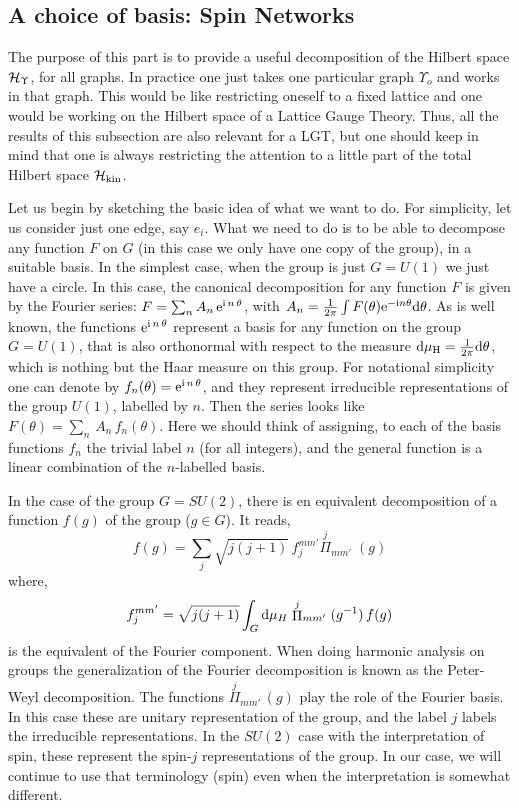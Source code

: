 \documentclass[aps,prd,tightenlines,showpacs,nofootinbib,preprint]{revtex4}
\def\be{\begin{equation}}
\def\ee{\end{equation}}
\def\d{{\rm d}}
\def\ii{{\rm i}}
\def\e{{\rm e}}
\begin{document}
\subsection{A choice of basis: Spin Networks}

The purpose of this part is to provide a useful decomposition of
the Hilbert space ${\cal H}_\Upsilon$, for all graphs. In practice
one just takes one particular graph $\Upsilon_o$ and works in that
graph. This would be like restricting oneself to a fixed lattice
and one would be working on the Hilbert space of a Lattice Gauge
Theory. Thus, all the results of this subsection are also relevant
for a LGT, but one should keep in mind that one is always
restricting the attention to a little part of the total Hilbert
space ${\cal H}_{\rm kin}$.

Let us begin by sketching the basic idea of what we want to do.
For simplicity, let us consider just one edge, say $e_i$. What we
need to do is to be able to decompose any function $F$ on $G$ (in
this case we only have one copy of the group), in a suitable
basis. In the simplest case, when the group is just $G=U(1)$ we
just have a circle. In this case, the canonical decomposition for
any function $F$ is given by the Fourier series: $F=\sum_n
A_n\,\e^{\ii \,n\,\theta}$, with $A_n=\frac{1}{2\pi}\int
F(\theta)\e^{-\ii n\theta}\d\theta$. As is well known, the
functions $\e^{\ii \,n\,\theta}$ represent a basis for any
function on the group $G=U(1)$, that is also orthonormal with
respect to the measure $\d\mu_{\rm H}=\frac{1}{2\pi}\d\theta$,
which is nothing but the Haar measure on this group. For
notational simplicity one can denote by $f_n(\theta)=\e^{\ii
\,n\,\theta}$, and they represent irreducible representations of
the group $U(1)$, labelled by $n$. Then the series looks like
$F(\theta)=\sum_n\,A_n\,f_n(\theta)$. Here we should think of
assigning, to each of the basis functions $f_n$ the trivial label
$n$ (for all integers), and the general function is a linear
combination of the $n$-labelled basis.

In the case of the group $G=SU(2)$, there is en equivalent decomposition of
a function $f(g)$ of the group ($g\in G$). It reads,
\be
 f(g)=\sum_j\sqrt{j(j+1)}\,f^{m m'}_j\stackrel{j}{\Pi}_{m m'}\;(g)
\ee where, \be f^{m m'}_j=\sqrt{j(j+1)}\int_G\d\mu_H
\stackrel{j}{\Pi}_{m m'}(g^{-1})\,f(g) \ee is the equivalent of
the Fourier component. When doing harmonic analysis on groups the
generalization of the Fourier decomposition is known as the
Peter-Weyl decomposition. The functions $\stackrel{j}{\Pi}_{m
m'}\,(g)$ play the role of the Fourier basis. In this case these
are unitary representation of the group, and the label $j$ labels
the irreducible representations. In the $SU(2)$ case with the
interpretation of spin, these represent the spin-$j$
representations of the group. In our case, we will continue to use
that terminology (spin) even when the interpretation is somewhat
different.
\end{document}

